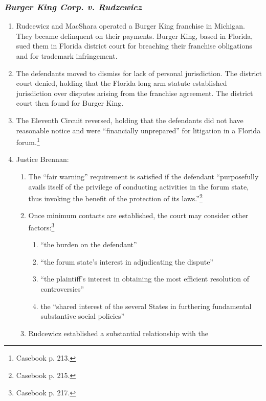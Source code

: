 \subsubsection{\emph{Burger King Corp. v. Rudzewicz}}

\begin{enumerate}
    \item Rudcewicz and MacShara operated a Burger King franchise in Michigan. 
    They became delinquent on their payments. Burger King, based in Florida, 
    sued them in Florida district court for breaching their franchise 
    obligations and for trademark infringement.
    \item The defendants moved to dismiss for lack of personal jurisdiction. 
    The district court denied, holding that the Florida long arm statute 
    established jurisdiction over disputes arising from the franchise 
    agreement. The district court then found for Burger King.
    \item The Eleventh Circuit reversed, holding that the defendants did not 
    have reasonable notice and were ``financially unprepared'' for litigation 
    in a Florida forum.\footnote{Casebook p. 213.}
    \item Justice Brennan:
    \begin{enumerate}
        \item The ``fair warning'' requirement is satisfied if the defendant 
        ``purposefully avails itself of the privilege of conducting activities 
        in the forum state, thus invoking the benefit of the protection of its 
        laws.''\footnote{Casebook p. 215.}
        \item Once minimum contacts are established, the court may consider 
        other factors:\footnote{Casebook p. 217.}
        \begin{enumerate}
            \item ``the burden on the defendant''
            \item ``the forum state's interest in adjudicating the dispute''
            \item ``the plaintiff's interest in obtaining the most efficient 
            resolution of controversies''
            \item the ``shared interest of the several States in furthering 
            fundamental substantive social policies''
        \end{enumerate}
        \item Rudcewicz established a substantial relationship with the 

\end{enumerate}
\end{enumerate}
